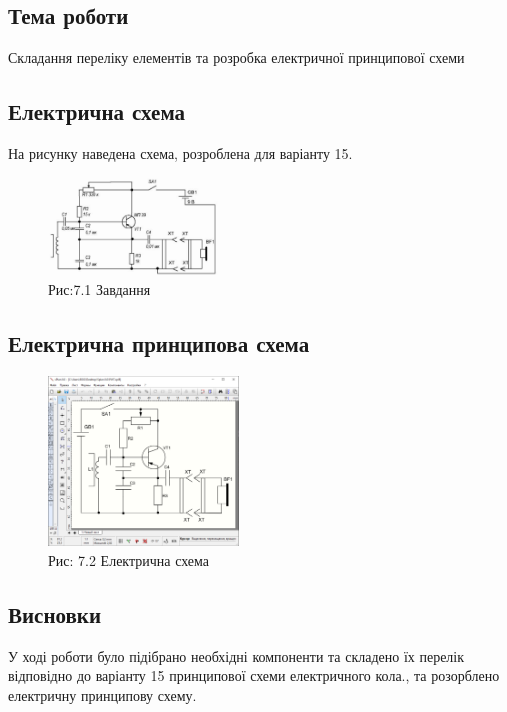 \documentclass[a4paper]{article}
\begin{document}
\subsection*{Тема роботи}
Складання переліку елементів 
    та розробка електричної 
    принципової схеми
\subsection*{Електрична схема}
На рисунку наведена схема, розроблена для варіанту 15.

\begin{figure}[h]
    \centering
    \includegraphics[width=0.4\textwidth]{imgs/PW7.1.png}
    \caption*{Рис:7.1 Завдання}
\end{figure}

\subsection*{Електрична принципова схема}
\begin{figure}[h]
    \centering
    \includegraphics[width=0.45\textwidth]{imgs/PW7.2.png}
    \caption*{Рис: 7.2 Електрична схема}
\end{figure}

\subsection*{Висновки}
У ході роботи було підібрано необхідні компоненти та складено їх перелік відповідно до варіанту 15 принципової схеми електричного кола., та розорблено електричну принципову схему.
\end{document}
